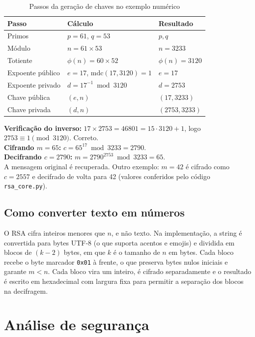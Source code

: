 \documentclass[11pt, a4paper]{article}
\begin{document}
\begin{table}[h!]
    \centering
    \caption{Passos da geração de chaves no exemplo numérico}
    \begin{tabular}{lll}
        \toprule
        \textbf{Passo} & \textbf{Cálculo} & \textbf{Resultado} \\
        \midrule
        Primos & $p=61$, $q=53$ & $p, q$ \\
        Módulo & $n = 61 \times 53$ & $n = 3233$ \\
        Totiente & $\phi(n) = 60 \times 52$ & $\phi(n) = 3120$ \\
        Expoente público & $e = 17$, $\text{mdc}(17, 3120) = 1$ & $e = 17$ \\
        Expoente privado & $d = 17^{-1} \bmod 3120$ & $d = 2753$ \\
        Chave pública & $(e, n)$ & $(17, 3233)$ \\
        Chave privada & $(d, n)$ & $(2753, 3233)$ \\
        \bottomrule
    \end{tabular}
\end{table}

\noindent \textbf{Verificação do inverso:} $17 \times 2753 = 46801 = 15 \cdot 3120 + 1$, logo $2753 \equiv 1 \pmod{3120}$. Correto.\\[0.3em]
\noindent \textbf{Cifrando $m=65$:} $c = 65^{17} \bmod 3233 = 2790$.\\[0.3em]
\noindent \textbf{Decifrando $c=2790$:} $m = 2790^{2753} \bmod 3233 = 65$.\\[0.3em]
A mensagem original é recuperada. Outro exemplo: $m=42$ é cifrado como $c=2557$ e decifrado de volta para 42 (valores conferidos pelo código \texttt{rsa\_core.py}).

\subsection{Como converter texto em números}
O RSA cifra inteiros menores que $n$, e não texto. Na implementação, a string é convertida para bytes UTF-8 (o que suporta acentos e emojis) e dividida em blocos de $(k-2)$ bytes, em que $k$ é o tamanho de $n$ em bytes. Cada bloco recebe o byte marcador \texttt{0x01} à frente, o que preserva bytes nulos iniciais e garante $m < n$. Cada bloco vira um inteiro, é cifrado separadamente e o resultado é escrito em hexadecimal com largura fixa para permitir a separação dos blocos na decifragem.

\section{Análise de segurança}
\end{document}

